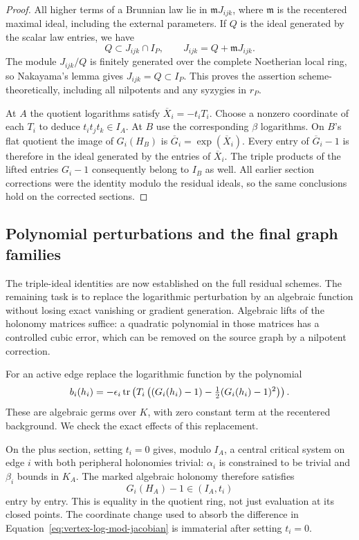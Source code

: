 \begin{proof}
All higher terms of a Brunnian law lie in $\mathfrak m J_{ijk}$, where
$\mathfrak m$ is the recentered maximal ideal, including the external
parameters.  If $Q$ is the ideal generated by the scalar law entries,
we have
\[
 Q\subset J_{ijk}\cap I_P,
 \qquad J_{ijk}=Q+\mathfrak m J_{ijk}.
\]
The module $J_{ijk}/Q$ is finitely generated over the complete
Noetherian local ring, so Nakayama's lemma gives $J_{ijk}=Q\subset I_P$.
This proves the assertion scheme-theoretically, including all
nilpotents and any syzygies in $r_P$.

At $A$ the quotient logarithms satisfy $\overline X_i=-t_iT_i$.
Choose a nonzero coordinate of each $T_i$ to deduce
$t_it_jt_k\in I_A$.  At $B$ use the corresponding $\beta$ logarithms.
On $B$'s flat quotient the image of $G_i(H_B)$ is
$\overline G_i=\exp(\overline X_i)$.  Every entry of
$\overline G_i-1$ is therefore in the ideal generated by the entries
of $\overline X_i$.  The triple products of the lifted entries
$G_i-1$ consequently belong to $I_B$ as well.  All earlier section
corrections were the
identity modulo the residual ideals, so the same conclusions hold on
the corrected sections.
\end{proof}

\subsection{Polynomial perturbations and the final graph families}
\label{subsec:vertex-polynomial}

The triple-ideal identities are now established on the full residual
schemes. The remaining task is to replace the logarithmic perturbation
by an algebraic function without losing exact vanishing or gradient
generation. Algebraic lifts of the holonomy matrices suffice: a
quadratic polynomial in those matrices has a controlled cubic error,
which can be removed on the source graph by a nilpotent correction.

For an active edge replace the logarithmic function by the polynomial
\begin{equation}
\label{eq:vertex-polynomial-weight}
 b_i(h_i)=-\epsilon_i\operatorname{tr}\left(
 T_i\left((G_i(h_i)-1)-\tfrac12(G_i(h_i)-1)^2\right)\right).
\end{equation}
These are algebraic germs over $K$, with zero constant term at the
recentered background.  We check the exact effects of this replacement.

On the plus section, setting $t_i=0$ gives, modulo $I_A$, a central
critical system on edge $i$ with both peripheral holonomies trivial:
$\alpha_i$ is constrained to be trivial and $\beta_i$ bounds in $K_A$.
The marked algebraic holonomy therefore satisfies
\begin{equation}
\label{eq:vertex-holonomy-ideal}
 G_i(H_A)-1\in (I_A,t_i)
\end{equation}
entry by entry.  This is equality in the quotient ring, not just
evaluation at its closed points.  The coordinate change used to absorb the difference in
Equation~\eqref{eq:vertex-log-mod-jacobian} is immaterial after setting $t_i=0$.

